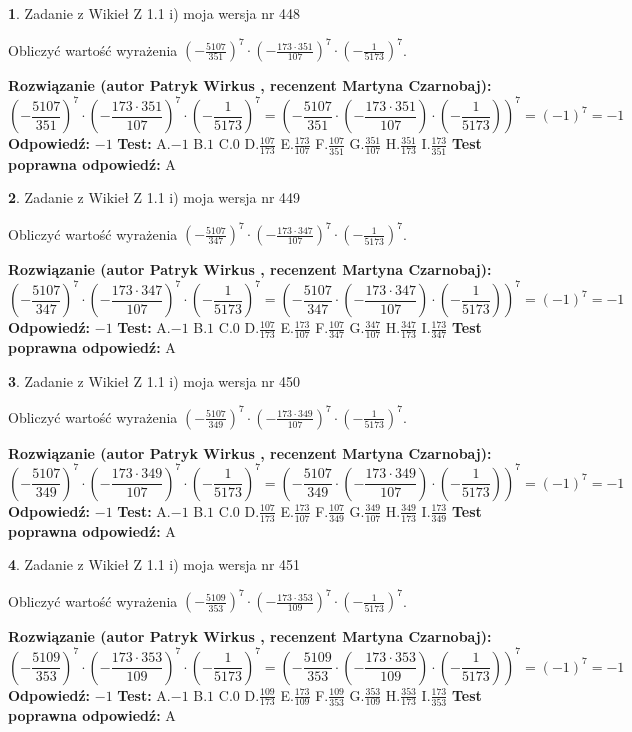 \documentclass[12pt, a4paper]{article}
\theoremstyle{definition} %
\newtheorem{zad}{}
\newcommand{\zadStart}[1]{\begin{zad}#1\newline}
\newcommand{\zadStop}{\end{zad}}
\newcommand{\rozwStart}[2]{\noindent \textbf{Rozwiązanie (autor #1 , recenzent #2): }\newline}
\newcommand{\rozwStop}{\newline}
\newcommand{\odpStart}{\noindent \textbf{Odpowiedź:}\newline}
\newcommand{\odpStop}{\newline}
\newcommand{\testStart}{\noindent \textbf{Test:}\newline}
\newcommand{\testStop}{\newline}
\newcommand{\kluczStart}{\noindent \textbf{Test poprawna odpowiedź:}\newline}
\newcommand{\kluczStop}{\newline}
\begin{document}
\zadStart{Zadanie z Wikieł Z 1.1 i) moja wersja nr 448}

Obliczyć wartość wyrażenia $(-\frac{5107}{351})^{7} \cdot (-\frac{173 \cdot 351}{107})^{7} \cdot (-\frac{1}{5173})^{7}$.
\zadStop
\rozwStart{Patryk Wirkus}{Martyna Czarnobaj}
$$(-\frac{5107}{351})^{7} \cdot (-\frac{173 \cdot 351}{107})^{7} \cdot (-\frac{1}{5173})^{7} = (-\frac{5107}{351} \cdot (-\frac{173 \cdot 351}{107}) \cdot (-\frac{1}{5173}))^{7} = (-1)^{7} = -1$$
\rozwStop
\odpStart
$-1$
\odpStop
\testStart
A.$-1$ B.$1$ C.$0$ D.$\frac{107}{173}$ E.$\frac{173}{107}$
F.$\frac{107}{351}$ G.$\frac{351}{107}$
H.$\frac{351}{173}$
I.$\frac{173}{351}$
\testStop
\kluczStart
A
\kluczStop



\zadStart{Zadanie z Wikieł Z 1.1 i) moja wersja nr 449}

Obliczyć wartość wyrażenia $(-\frac{5107}{347})^{7} \cdot (-\frac{173 \cdot 347}{107})^{7} \cdot (-\frac{1}{5173})^{7}$.
\zadStop
\rozwStart{Patryk Wirkus}{Martyna Czarnobaj}
$$(-\frac{5107}{347})^{7} \cdot (-\frac{173 \cdot 347}{107})^{7} \cdot (-\frac{1}{5173})^{7} = (-\frac{5107}{347} \cdot (-\frac{173 \cdot 347}{107}) \cdot (-\frac{1}{5173}))^{7} = (-1)^{7} = -1$$
\rozwStop
\odpStart
$-1$
\odpStop
\testStart
A.$-1$ B.$1$ C.$0$ D.$\frac{107}{173}$ E.$\frac{173}{107}$
F.$\frac{107}{347}$ G.$\frac{347}{107}$
H.$\frac{347}{173}$
I.$\frac{173}{347}$
\testStop
\kluczStart
A
\kluczStop



\zadStart{Zadanie z Wikieł Z 1.1 i) moja wersja nr 450}

Obliczyć wartość wyrażenia $(-\frac{5107}{349})^{7} \cdot (-\frac{173 \cdot 349}{107})^{7} \cdot (-\frac{1}{5173})^{7}$.
\zadStop
\rozwStart{Patryk Wirkus}{Martyna Czarnobaj}
$$(-\frac{5107}{349})^{7} \cdot (-\frac{173 \cdot 349}{107})^{7} \cdot (-\frac{1}{5173})^{7} = (-\frac{5107}{349} \cdot (-\frac{173 \cdot 349}{107}) \cdot (-\frac{1}{5173}))^{7} = (-1)^{7} = -1$$
\rozwStop
\odpStart
$-1$
\odpStop
\testStart
A.$-1$ B.$1$ C.$0$ D.$\frac{107}{173}$ E.$\frac{173}{107}$
F.$\frac{107}{349}$ G.$\frac{349}{107}$
H.$\frac{349}{173}$
I.$\frac{173}{349}$
\testStop
\kluczStart
A
\kluczStop



\zadStart{Zadanie z Wikieł Z 1.1 i) moja wersja nr 451}

Obliczyć wartość wyrażenia $(-\frac{5109}{353})^{7} \cdot (-\frac{173 \cdot 353}{109})^{7} \cdot (-\frac{1}{5173})^{7}$.
\zadStop
\rozwStart{Patryk Wirkus}{Martyna Czarnobaj}
$$(-\frac{5109}{353})^{7} \cdot (-\frac{173 \cdot 353}{109})^{7} \cdot (-\frac{1}{5173})^{7} = (-\frac{5109}{353} \cdot (-\frac{173 \cdot 353}{109}) \cdot (-\frac{1}{5173}))^{7} = (-1)^{7} = -1$$
\rozwStop
\odpStart
$-1$
\odpStop
\testStart
A.$-1$ B.$1$ C.$0$ D.$\frac{109}{173}$ E.$\frac{173}{109}$
F.$\frac{109}{353}$ G.$\frac{353}{109}$
H.$\frac{353}{173}$
I.$\frac{173}{353}$
\testStop
\kluczStart
A
\kluczStop
\end{document}
